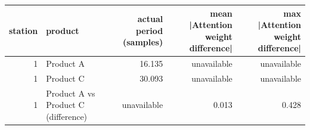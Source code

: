 \begin{tabular}{rlrrr}
\toprule
station & product & actual period (samples) & mean |Attention weight difference| & max |Attention weight difference| \\
\midrule
1 & Product A & 16.135 & unavailable & unavailable \\
1 & Product C & 30.093 & unavailable & unavailable \\
1 & Product A vs Product C (difference) & unavailable & 0.013 & 0.428 \\
\bottomrule
\end{tabular}
